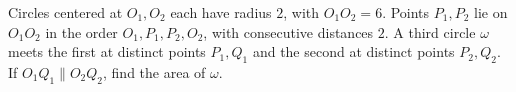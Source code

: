 Circles centered at $O_1,O_2$ each have radius $2$, with $O_1O_2=6$. Points $P_1,P_2$ lie on $O_1O_2$ in the order $O_1,P_1,P_2,O_2$, with consecutive distances $2$. A third circle $\omega$ meets the first at distinct points $P_1,Q_1$ and the second at distinct points $P_2,Q_2$. If $O_1Q_1\parallel O_2Q_2$, find the area of $\omega$.

